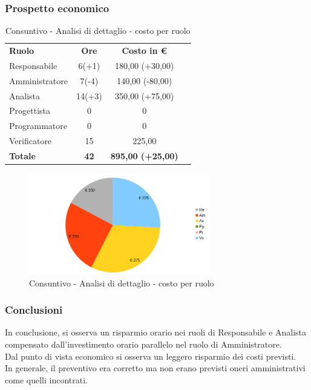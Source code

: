 \newpage
\subsubsection{Prospetto economico}


\begin{table} [h!]
	\begin{center}
		\begin{tabular} { m{3 cm} c c c  }
			\rowcolor{lightgray}
			\textbf{Ruolo}  & \textbf{Ore} & \textbf{Costo in \euro} \\
			Responsabile    & 6(+1)      & 180,00 (+30,00) \\
			Amministratore  & 7(-4)      & 140,00 (-80,00)  \\
			Analista        & 14(+3)     & 350,00 (+75,00) \\
			Progettista     & 0          & 0 \\
			Programmatore   & 0          & 0  \\
			Verificatore    & 15         & 225,00  \\
			\textbf{Totale} & \textbf{42}         & \textbf{895,00 (+25,00)} \\
			
		\end{tabular}
		\caption{Consuntivo - Analisi di dettaglio - costo per ruolo}
	\end{center}
\end{table}
	\begin{figure} [h!]
	\centering
	\includegraphics[width=0.7\textwidth]{res/img/grafici/consuntivo-torta-analisi di dettaglio.png}
	\caption{Consuntivo - Analisi di dettaglio - costo per ruolo} 
\end{figure}

\subsubsection{Conclusioni }
In conclusione, si osserva un risparmio orario nei ruoli di Responsabile e Analista compensato dall'investimento orario parallelo nel ruolo di Amministratore.\\
Dal punto di vista economico si osserva un leggero risparmio dei costi previsti. \\
In generale, il preventivo era corretto ma non erano previsti oneri amministrativi come quelli incontrati.



